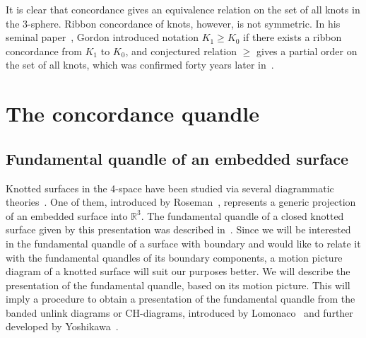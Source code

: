 \documentclass[a4paper,12pt]{amsart}
\numberwithin{equation}{section}
\theoremstyle{plain}
\theoremstyle{definition}
\begin{document}
It is clear that concordance gives an equivalence relation on the set of all knots in the 3-sphere. 
Ribbon concordance of knots, however, is not symmetric. 
In his seminal paper~\cite{G}, Gordon introduced notation $K_{1}\geq K_0$ if there exists a ribbon concordance from $K_1$ to $K_0$, and conjectured relation $\geq $ gives a partial order on the set of all knots, which was confirmed forty years later in~\cite{A}.  
 




































\section{The concordance quandle}
\label{sec2}


\subsection{Fundamental quandle of an embedded surface}
\label{subsec2-1}


Knotted surfaces in the 4-space have been studied via several diagrammatic theories~\cite{CS,CKS2}.
One of them, introduced by Roseman~\cite{R}, represents a generic projection of an embedded surface into $\mathbb{R}^{3}$. 
The fundamental quandle of a closed knotted surface given by this presentation was described in~\cite{CKS1}. 
Since we will be interested in the fundamental quandle of a surface with boundary and would like to relate it with the fundamental quandles of its boundary components, a motion picture diagram of a knotted surface will suit our purposes better. 
We will describe the presentation of the fundamental quandle, based on its motion picture. 
This will imply a procedure to obtain a presentation of the fundamental quandle from the banded unlink diagrams or CH-diagrams, introduced by Lomonaco~\cite{L} and further developed by Yoshikawa~\cite{Y}.
\end{document}
